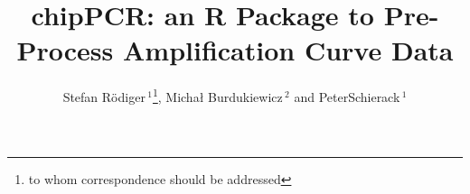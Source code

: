 \documentclass{bioinfo}
\begin{document}

\title[chipPCR]{chipPCR: an R Package to Pre-Process Amplification Curve Data}
\author[R\"odiger \textit{et~al.}]{Stefan R\"odiger\,$^{1}$\footnote{to whom correspondence should be addressed}, Micha\l{} Burdukiewicz\,$^{2}$ and PeterSchierack\,$^1$}
\address{$^{1}$Faculty of Natural Sciences, Brandenburg University of Technology 
Cottbus--Senftenberg, Senftenberg, Germany\\
$^{2}$Department of Genomics, Faculty of Biotechnology, University of 
Wroc\l{}aw, Wroc\l{}aw, Poland}



\maketitle
\end{document}
